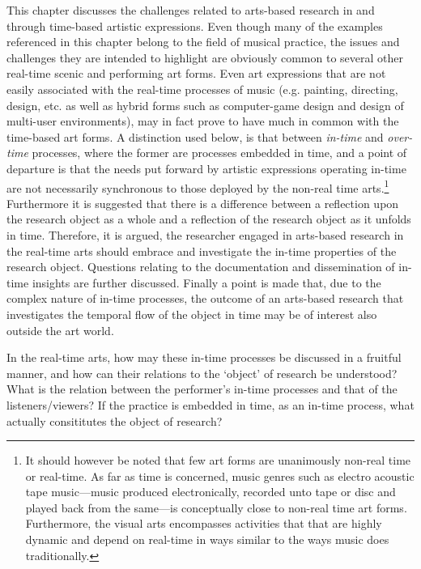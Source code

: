 This chapter discusses the challenges related to arts-based research in and through time-based artistic expressions. Even though many of the examples referenced in this chapter belong to the field of musical practice, the issues and challenges they are intended to highlight are obviously common to several other real-time scenic and performing art forms. Even art expressions that are not easily associated with the real-time processes of music (e.g. painting, directing, design, etc. as well as hybrid forms such as computer-game design and design of multi-user environments), may in fact prove to have much in common with the time-based art forms. A distinction used below, is that between \emph{in-time} and \emph{over-time} processes, where the former are processes embedded in time, and a point of departure is that the needs put forward by artistic expressions operating in-time are not necessarily synchronous to those deployed by the non-real time arts.\footnote{It should however be noted that few art forms are unanimously non-real time or real-time. As far as time is concerned, music genres such as electro acoustic tape music---music produced electronically, recorded unto tape or disc and played back from the same---is conceptually close to non-real time art forms. Furthermore, the visual arts encompasses activities that that are highly dynamic and depend on real-time in ways similar to the ways music does traditionally.} Furthermore it is suggested that there is a difference between a reflection upon the research object as a whole and a reflection of the research object as it unfolds in time. Therefore, it is argued, the researcher engaged in arts-based research in the real-time arts should embrace and investigate the in-time properties of the research object. Questions relating to the documentation and dissemination of in-time insights are further discussed. Finally a point is made that, due to the complex nature of in-time processes, the outcome of an arts-based research that investigates the temporal flow of the object in time may be of interest also outside the art world. 

In the real-time arts, how may these in-time processes be discussed in a fruitful manner, and how can their relations to the `object' of research be understood? What is the relation between the performer's in-time processes and that of the listeners/viewers? If the practice is embedded in time, as an in-time process, what actually consititutes the object of research?

